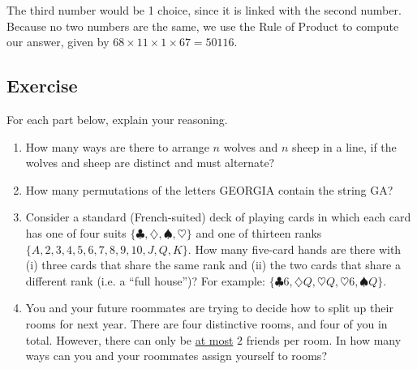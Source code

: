 \documentclass{article}
\newcounter{counter}
\newcommand{\Exercise}{Exercise \stepcounter{counter}\thecounter}
\begin{document}
\begin{enumerate}
        \vspace{1.5mm} The third number would be 1 choice, since it is linked with the second number. Because no two numbers are the same, we use the Rule of Product to compute our answer, given by $68 \times 11 \times 1  \times 67 = 50116.$
    \end{enumerate}

\subsection*{\Exercise}
    For each part below, explain your reasoning.
    \begin{enumerate}
        \item How many ways are there to arrange $n$ wolves and $n$ sheep in a line, if the wolves and sheep are distinct and must alternate?
        \item How many permutations of the letters GEORGIA contain the string GA?
        \item Consider a standard (French-suited) deck of playing cards in which each card has one of four suits $\{\clubsuit,\diamondsuit,\spadesuit,\heartsuit\}$  and one of thirteen ranks $\{A,2,3,4,5,6,7,8,9,10,J,Q,K\}$. How many five-card hands are there with (i) three cards that share the same rank and (ii) the two cards that share a different rank (i.e. a “full house”)? For example: $\{\clubsuit 6, \diamondsuit Q, \heartsuit Q, \heartsuit 6, \spadesuit Q\}$.
        \item You and your future roommates are trying to decide how to split up their rooms for next year. There are four distinctive rooms, and four of you in total. However, there can only be \underline{at most} $2$ friends per room. In how many ways can you and your roommates assign yourself to rooms?
    \end{enumerate}
\end{document}
